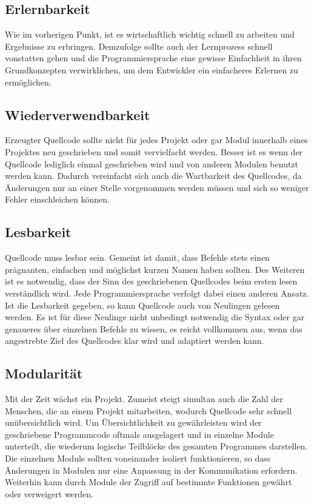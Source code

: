 \subsection{Erlernbarkeit}
\label{sec:Erlernbarkeit}
Wie im vorherigen Punkt, ist es wirtschaftlich wichtig schnell zu arbeiten und Ergebnisse zu erbringen. Demzufolge sollte auch der Lernprozess schnell vonstatten gehen und die Programmiersprache eine gewisse Einfachheit in ihren Grundkonzepten verwirklichen, um dem Entwickler ein einfacheres Erlernen zu ermöglichen.



\subsection{Wiederverwendbarkeit}
\label{sec:Wiederverwendbarkeit}
Erzeugter Quellcode sollte nicht für jedes Projekt oder gar Modul innerhalb eines Projektes neu geschrieben und somit vervielfacht werden. Besser ist es wenn der Quellcode lediglich einmal geschrieben wird und von anderen Modulen benutzt werden kann. Dadurch vereinfacht sich auch die Wartbarkeit des Quellcodes, da Änderungen nur an einer Stelle vorgenommen werden müssen und sich so weniger Fehler einschleichen können.



\subsection{Lesbarkeit}
\label{sec:Lesbarkeit}
Quellcode muss lesbar sein. Gemeint ist damit, dass Befehle stets einen prägnanten, einfachen und möglichst kurzen Namen haben sollten. Des Weiteren ist es notwendig, dass der Sinn des geschriebenen Quellcodes beim ersten lesen verständlich wird. Jede Programmiersprache verfolgt dabei einen anderen Ansatz. Ist die Lesbarkeit gegeben, so kann Quellcode auch von Neulingen gelesen werden. Es ist für diese Neulinge nicht unbedingt notwendig die Syntax oder gar genaueres über einzelnen Befehle zu wissen, es reicht vollkommen aus, wenn das angestrebte Ziel des Quellcodes klar wird und adaptiert werden kann.



\subsection{Modularität}
\label{sec:Modularität_Analyse}
Mit der Zeit wächst ein Projekt. Zumeist steigt simultan auch die Zahl der Menschen, die an einem Projekt mitarbeiten, wodurch Quellcode sehr schnell unübersichtlich wird. Um Übersichtlichkeit zu gewährleisten wird der geschriebene Programmcode oftmals ausgelagert und in einzelne Module unterteilt, die wiederum logische Teilblöcke des gesamten Programmes darstellen. Die einzelnen Module sollten voneinander isoliert funktionieren, so dass Änderungen in Modulen nur eine Anpassung in der Kommunikation erfordern. Weiterhin kann durch Module der Zugriff auf bestimmte Funktionen gewährt oder verweigert werden.


